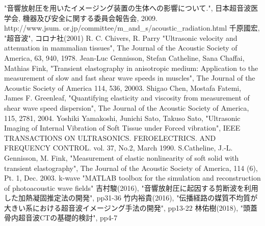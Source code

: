 \begin{thebibliography}{9}
     "音響放射圧を用いたイメージング装置の生体への影響について.", 日本超音波医学会, 機器及び安全に関する委員会報告会, 2009. \\http://www.jsum. or.jp/committee/m\_and\_s/acoustic\_radiation.html
      千原國宏,     
     "超音波", コロナ社(2001)
      R. C. Chivers, R. Parry
     "Ultrasonic velocity and attenuation in mammalian tissues", The Journal of the Acoustic Society of America, 63, 940, 1978.
       Jean-Luc Gennisson, Stefan Catheline, Sana Chaffai, Mathias Fink,
      "Transient elastography in anisotropic medium: Application to the measurement of slow and fast shear wave speeds in muscles", The Journal of the Acoustic Society of America 114, 536, 20003.
       Shigao Chen, Mostafa Fatemi, James F. Greenleaf,
      "Quantifying elasticity and viscosity from measurement of shear wave speed dispersion", The Journal of the Acoustic Society of America, 115, 2781, 2004.
       Yoshiki Yamakoshi, Junichi Sato, Takuso Sato,
      "Ultrasonic Imaging of Internal Vibration of Soft Tissue under Forced vibration", IEEE TRANSACTIONS ON ULTRASONICS. FEROELECTRICS. AND FREQUENCY CONTROL. vol. 37, No.2, March 1990.
       S.Catheline, J.-L. Gennisson, M. Fink,
      "Measurement of elastic nonlinearity of soft solid with transient elastography", The Journal of the Acoustic Society of America, 114 (6), Pt. 1, Dec. 2003.
      k-wave
     "MATLAB toolbox for the simulation and reconstruction of photoacoustic wave fields"
      吉村駿(2016),
     "音響放射圧に起因する剪断波を利用した加熱凝固推定法の開発", pp31-36
      竹内裕貴(2016),
     "伝播経路の媒質不均質が大きい系における超音波イメージング手法の開発", pp13-22
      林佑樹(2018),
     "頭蓋骨内超音波CTの基礎的検討", pp4-7
\end{thebibliography}